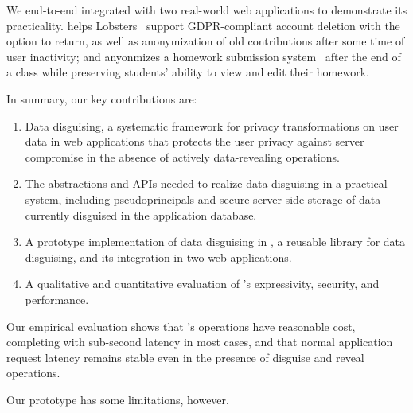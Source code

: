 %
%
We end-to-end integrated \sys with two real-world web applications to demonstrate
its practicality.
%
\sys helps Lobsters~\cite{lobsters} support GDPR-compliant account deletion with
the option to return, as well as anonymization of old contributions after some
time of user inactivity; and \sys anyonmizes a homework submission
system~\cite{websubmit-rs-anon} after the end of a class while preserving
students' ability to view and edit their homework.
%

%
%
In summary, our key contributions are:
%
\begin{enumerate}[nosep]
 \item Data disguising, a systematic framework for privacy transformations on
   user data in web applications that protects the user privacy against server
   compromise in the absence of actively data-revealing operations.
 \item The abstractions and APIs needed to realize data disguising in a
  practical system, including pseudoprincipals and secure server-side storage
  of data currently disguised in the application database.
 \item A prototype implementation of data disguising in \sys, a reusable
  library for data disguising, and its integration in two web applications.
 \item A qualitative and quantitative evaluation of \sys's expressivity,
  security, and performance.
\end{enumerate}
%
Our empirical evaluation shows that \sys's operations have reasonable cost,
completing with sub-second latency in most cases, and that normal application
request latency remains stable even in the presence of disguise and reveal
operations.
%

%
%
Our prototype has some limitations, however.
%


